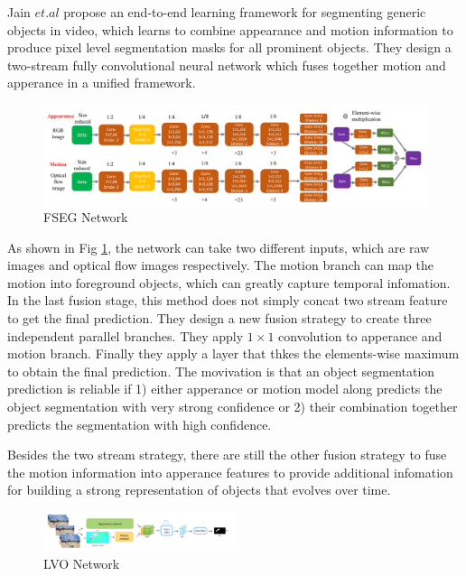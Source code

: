 Jain $et.al$ \cite{Jain2017FusionSeg} propose an end-to-end learning framework for segmenting generic objects in video,
which learns to combine appearance and motion information to produce pixel level segmentation masks for all prominent objects.
They design a two-stream fully convolutional neural network which fuses together motion and apperance in a unified framework.

\begin{figure}
    \begin{center}
    \includegraphics[width=\textwidth]{figure/FSEG_NET.png}
    \end{center}
    \caption{FSEG Network}
    \label{FSEG}
\end{figure}

As shown in Fig \ref{FSEG}, the network can take two different inputs, which are raw images and optical flow images respectively.
The motion branch can map the motion into foreground objects, which can greatly capture temporal infomation.
In the last fusion stage, this method does not simply concat two stream feature to get the final prediction.
They design a new fusion strategy to create three independent parallel branches. They apply $1\times1$ convolution to apperance and
motion branch. Finally they apply a layer that thkes the elements-wise maximum to obtain the final prediction. The movivation is that 
an object segmentation prediction is reliable if 1) either apperance or motion model along predicts the object 
segmentation with very strong confidence or 2) their combination together predicts the segmentation with high confidence. 

Besides the two stream strategy, there are still the other fusion strategy to fuse the motion information into apperance 
features to provide additional infomation for building a strong representation of objects that evolves over time. 

\begin{figure}[ht]
    \centering
    \includegraphics[width=0.5\textwidth]{./figure/LVO_NET.png}
    \caption{LVO Network}
    \label{LVO}
\end{figure}

